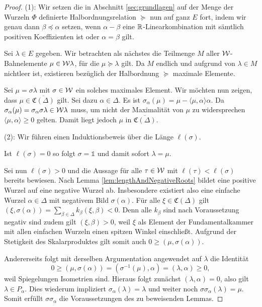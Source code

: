 \begin{proof}
  (1):
  Wir setzen die in Abschnitt \ref{sec:grundlagen} auf der Menge der Wurzeln $\Phi$ definierte Halbordnungsrelation $\succeq$ nun auf ganz $E$ fort, indem wir genau dann $\beta \preceq \alpha$ setzen, wenn $\alpha - \beta$ eine $\mathbb{R}$-Linearkombination mit sämtlich positiven Koeffizienten ist oder $\alpha = \beta$ gilt.

  Sei $\lambda \in E$ gegeben. 
  Wir betrachten als nächstes die Teilmenge $M$ aller $\mathcal{W}$\hyp{}Bahnelemente $\mu \in \mathcal{W}\lambda$, für die $\mu \succeq \lambda$ gilt.
  Da $M$ endlich und aufgrund von $\lambda \in M$ nichtleer ist, existieren bezüglich der Halbordnung $\succeq$ maximale Elemente.

  Sei $\mu = \sigma\lambda$ mit $\sigma \in \mathcal{W}$ ein solches maximales Element.
  Wir möchten nun zeigen, dass $\mu \in \overline{\mathfrak{C}(\Delta)}$ gilt.
  Sei dazu $\alpha \in \Delta$.
  Es ist $\sigma_\alpha(\mu) = \mu - \langle \mu, \alpha \rangle \alpha$.
  Da $\sigma_\alpha(\mu) = \sigma_\alpha \sigma \lambda \in \mathcal{W}\lambda$ muss, um nicht der Maximalität von $\mu$ zu widersprechen $\langle \mu, \alpha \rangle \geq 0$ gelten.
  Damit liegt jedoch $\mu$ in $\overline{\mathfrak{C}(\Delta)}$.

  (2):
  Wir führen einen Induktionsbeweis über die Länge $\ell(\sigma)$.

  Ist $\ell(\sigma) = 0$ so folgt $\sigma = \mathds{1}$ und damit sofort $\lambda = \mu$.

  Sei nun $\ell(\sigma) > 0$ und die Aussage für alle $\tau \in \mathcal{W}$ mit $\ell(\tau) < \ell(\sigma)$ bereits bewiesen.
  Nach Lemma \ref{lem:lengthAndNegativeRoots} bildet eine positive Wurzel auf eine negative Wurzel ab.
  Insbesondere existiert also eine einfache Wurzel $\alpha \in \Delta$ mit negativem Bild $\sigma(\alpha)$.
  Für alle $\xi \in \mathfrak{C}(\Delta)$ gilt $(\xi, \sigma(\alpha)) = \sum_{\beta \in \Delta} k_\beta (\xi,\beta) < 0$. 
  Denn alle $k_\beta$ sind nach Voraussetzung negativ sind zudem gilt $(\xi,\beta) > 0$, weil $\xi$ als Element der Fundamentalkammer mit allen einfachen Wurzeln einen spitzen Winkel einschließt.
  Aufgrund der Stetigkeit des Skalarproduktes gilt somit auch $0 \geq (\mu, \sigma(\alpha))$.
  
  Andererseits folgt mit derselben Argumentation angewendet auf $\lambda$ die Identität
  \begin{displaymath}
    0 \geq (\mu, \sigma(\alpha)) = (\sigma^{-1}(\mu), \alpha) = (\lambda, \alpha) \geq 0,
  \end{displaymath}
  weil Spiegelungen Isometrien sind.
  Hieraus folgt zunächst $(\lambda, \alpha) = 0$, also gilt $\lambda \in P_\alpha$.
  Dies wiederum impliziert $\sigma_\alpha(\lambda) = \lambda$ und weiter noch $\sigma \sigma_\alpha(\lambda) = \mu$.
  Somit erfüllt $\sigma \sigma_\alpha$ die Voraussetzungen des zu beweisenden Lemmas. 


\end{proof}
